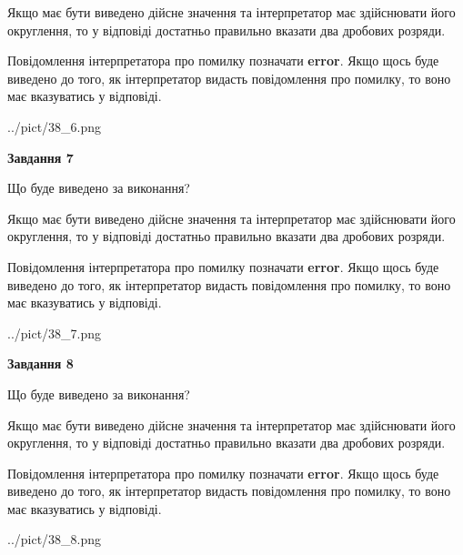 \documentclass[12pt, ukrainian]{article}
\begin{document}
{\begin {Large}
Якщо має бути виведено дійсне значення та інтерпретатор має здійснювати його округлення, 
то у відповіді достатньо правильно вказати два дробових розряди.

Повідомлення інтерпретатора про помилку позначати \textbf{error}.
Якщо щось буде виведено до того, як інтерпретатор видасть повідомлення про помилку, 
то воно має вказуватись у відповіді. \par

\begin{center}
	{../pict/38_6.png}
\end{center}
\newpage

{\begin {center}\textbf{Завдання 7}\end {center}}\par
Що буде виведено за виконання? \par

Якщо має бути виведено дійсне значення та інтерпретатор має здійснювати його округлення, 
то у відповіді достатньо правильно вказати два дробових розряди.

Повідомлення інтерпретатора про помилку позначати \textbf{error}.
Якщо щось буде виведено до того, як інтерпретатор видасть повідомлення про помилку, 
то воно має вказуватись у відповіді. \par

\begin{center}
	{../pict/38_7.png}
\end{center}
\newpage

{\begin {center}\textbf{Завдання 8}\end {center}}\par
Що буде виведено за виконання? \par

Якщо має бути виведено дійсне значення та інтерпретатор має здійснювати його округлення, 
то у відповіді достатньо правильно вказати два дробових розряди.

Повідомлення інтерпретатора про помилку позначати \textbf{error}.
Якщо щось буде виведено до того, як інтерпретатор видасть повідомлення про помилку, 
то воно має вказуватись у відповіді. \par

\begin{center}
	{../pict/38_8.png}
\end{center}
\newpage


\end{Large}}
\end{document}
